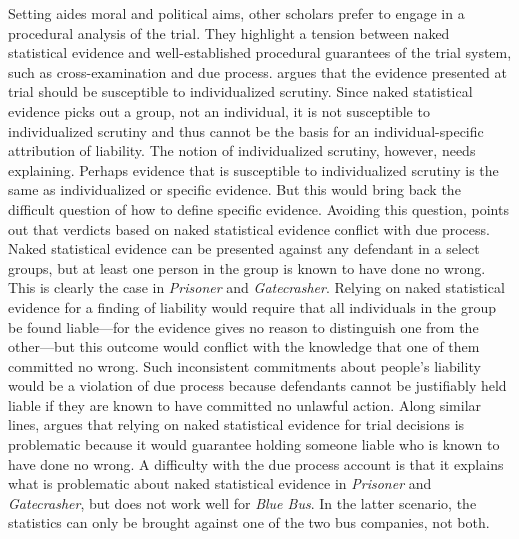 \documentclass{article}
\begin{document}
Setting aides moral and political aims, other scholars prefer to engage in a procedural analysis of the trial. They highlight a tension between  naked statistical evidence and well-established procedural guarantees of the trial system, such as cross-examination and due process.  
 \cite{Stein2005Foundations-of-} argues that the evidence presented at trial should be susceptible to individualized scrutiny.
 Since naked statistical evidence picks out a group, not an individual, it is not susceptible to individualized scrutiny and thus cannot be the basis for an individual-specific attribution of liability. The notion of individualized scrutiny, however, needs explaining. Perhaps evidence that is susceptible to individualized scrutiny is the same as individualized or specific evidence. But this would bring back the difficult   question of how to define specific evidence. 
%
Avoiding this question, \cite{nunn2015} points out that verdicts based on naked statistical evidence conflict with due process. 
 Naked statistical evidence can be presented against any defendant in a select groups, but at least one person in the group is known to have done no wrong.  This is clearly the case in \textit{Prisoner} and \textit{Gatecrasher}. 
  Relying on naked statistical evidence for a finding of liability would require that all individuals in the group be found liable---for the evidence gives no reason to distinguish one from the other---but this outcome would conflict with the knowledge that one of them committed no wrong. 
  Such inconsistent commitments about people's liability would be a violation of due process because defendants cannot be justifiably held liable if  they are known to have committed no unlawful action.  Along similar lines,
  \citet{Smith2020AgainstLP} argues that relying on naked statistical evidence for trial decisions is problematic because it would guarantee holding someone liable who is known to have done no wrong.  A difficulty with the due process account is that it explains what is problematic about naked statistical evidence in \textit{Prisoner} and \textit{Gatecrasher}, but does not work well for \textit{Blue Bus}. In the latter scenario, the statistics can only be brought against one of 
  the two bus companies, not both. 
 
\end{document}
